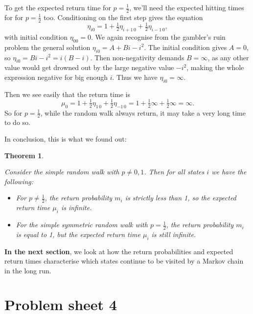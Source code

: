 \documentclass[
  a4paper,
]{article}
\providecommand{\tightlist}{%
  \setlength{\itemsep}{0pt}\setlength{\parskip}{0pt}}
\newif\ifcomm\commtrue
\newtheorem{theorem}{Theorem}[section]
\theoremstyle{definition}
\theoremstyle{definition}
\theoremstyle{definition}
\theoremstyle{remark}
\begin{document}
To get the expected return time for \(p = \frac12\), we'll need the expected hitting times for for \(p = \frac12\) too. Conditioning on the first step gives the equation
\[ \eta_{i0} = 1 + \tfrac12\eta_{i+1\,0} + \tfrac12\eta_{i-1\,0} , \]
with initial condition \(\eta_{00} = 0\). We again recognise from the gambler's ruin problem the general solution \(\eta_{i0} = A + Bi -i^2\). The initial condition gives \(A = 0\), so \(\eta_{i0} = Bi - i^2 = i(B-i)\). Then non-negativity demands \(B = \infty\), as any other value would get drowned out by the large negative value \(-i^2\), making the whole expression negative for big enough \(i\). Thus we have \(\eta_{i0} = \infty\).

Then we see easily that the return time is
\[ \mu_0 = 1 + \tfrac12 \eta_{1\,0} + \tfrac12 \eta_{-1\,0} = 1 + \tfrac12 \infty + \tfrac12 \infty = \infty. \]
So for \(p = \frac12\), while the random walk always return, it may take a very long time to do so.

In conclusion, this is what we found out:

\begin{theorem}
\protect\hypertarget{thm:rw-summary}{}\label{thm:rw-summary}

Consider the simple random walk with \(p \neq 0,1\). Then for all states \(i\) we have the following:

\begin{itemize}
\tightlist
\item
  For \(p \neq \frac12\), the return probability \(m_i\) is strictly less than 1, so the expected return time \(\mu_i\) is infinite.
\item
  For the simple symmetric random walk with \(p = \frac12\), the return probability \(m_i\) is equal to 1, but the expected return time \(\mu_i\) is still infinite.
\end{itemize}

\end{theorem}

\textbf{In the next section}, we look at how the return probabilities and expected return times characterise which states continue to be visited by a Markov chain in the long run.

\hypertarget{P04}{%
\section*{Problem sheet 4}\label{P04}}

\commtrue
\end{document}
